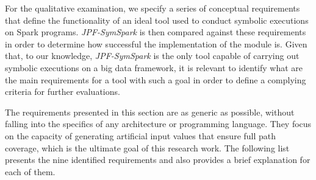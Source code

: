 \label{sec:qualitative}

For the qualitative examination, we specify a series of conceptual requirements that define the functionality of an ideal tool used to conduct symbolic executions on Spark programs. \textit{JPF-SymSpark} is then compared against these requirements in order to determine how successful the implementation of the module is. Given that, to our knowledge, \textit{JPF-SymSpark} is the only tool capable of carrying out symbolic executions on a big data framework, it is relevant to identify what are the main requirements for a tool with such a goal in order to define a complying criteria for further evaluations.

The requirements presented in this section are as generic as possible, without falling into the specifics of any architecture or programming language. They focus on the capacity of generating artificial input values that ensure full path coverage, which is the ultimate goal of this research work. The following list presents the nine identified requirements and also provides a brief explanation for each of them. 

\label{sec:requirement}

